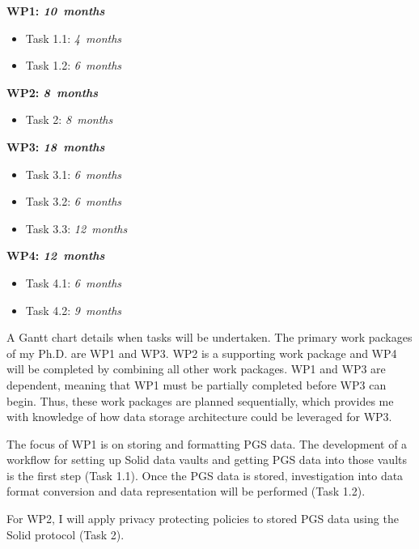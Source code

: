 \documentclass[a4paper,11pt]{article}
\begin{document}
\begin{refsection}
\begin{adjustwidth}{0cm}{0cm}
	\parindent 0pt
	\newcommand\duration[1]{\hfill\emph{#1~months}}
  
	\textbf{WP1:      \WPa  \duration{10}}
	\begin{itemize}
	  \item Task 1.1: \WPaa \duration{ 4}
	  \item Task 1.2: \WPab \duration{ 6}
	\end{itemize}
	\smallskip
  
	\textbf{WP2:      \WPb  \duration{8}}
	\begin{itemize}
	  \item Task 2: \WPba \duration{ 8}
	\end{itemize}
  \smallskip
	
	\textbf{WP3:      \WPc  \duration{18}}
	\begin{itemize}
	  \item Task 3.1: \WPca \duration{ 6}
	  \item Task 3.2: \WPcb \duration{ 6}
	  \item Task 3.3: \WPcc \duration{ 12}
	\end{itemize}
	\smallskip
	
	\textbf{WP4:      \WPd  \duration{ 12}}
  \begin{itemize}
	  \item Task 4.1: \WPda \duration{ 6}
	  \item Task 4.2: \WPdb \duration{ 9}
	\end{itemize}
\end{adjustwidth}

\noindent
A Gantt chart details when tasks will be undertaken.
The primary work packages of my Ph.D. are WP1 and WP3.
WP2 is a supporting work package and WP4 will be completed by combining all other work packages.
WP1 and WP3 are dependent, meaning that WP1 must be partially completed before WP3 can begin.
Thus, these work packages are planned sequentially, which provides me with knowledge of how data storage architecture could be leveraged for WP3.

The focus of WP1 is on storing and formatting PGS data.
The development of a workflow for setting up Solid data vaults and getting PGS data into those vaults is the first step (Task 1.1).
Once the PGS data is stored, investigation into data format conversion and data representation will be performed (Task 1.2).

For WP2, I will apply privacy protecting policies to stored PGS data using the Solid protocol (Task 2).


\end{refsection}
\end{document}
